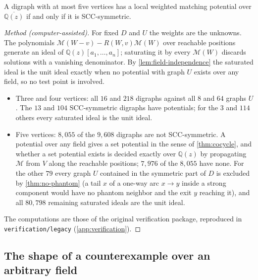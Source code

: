 \documentclass[final]{siamart0516}
\numberwithin{theorem}{section}
\numberwithin{equation}{section}
\theoremstyle{siamnonum}
\theoremstyle{plain}
\newcommand{\code}[1]{{\ttfamily\nolinkurl{#1}}}
\newcommand{\QQ}{\mathbb{Q}}
\newcommand{\Qz}{\QQ(z)}
\newcommand{\Qzbar}{\overline{\QQ(z)}}
\newcommand{\Mpot}{\mathcal{M}}           %
\begin{document}
\begin{theorem}\label{thm:exact5}
A digraph with at most five vertices has a local weighted matching potential over $\Qzbar$ if and only if it is SCC-symmetric.
\end{theorem}
\begin{proof}[Method \textup{(computer-assisted)}]
For fixed $D$ and $U$ the weights are the unknowns. The polynomials $\Mpot(W-v)-R(W,v)\Mpot(W)$ over reachable positions generate an ideal of $\Qz[a_1,\dots,a_n]$; saturating it by every $\Mpot(W)$ discards solutions with a vanishing denominator. By \cref{lem:field-independence} the saturated ideal is the unit ideal exactly when no potential with graph $U$ exists over any field, so no test point is involved.
\begin{itemize}
\item Three and four vertices: all $16$ and $218$ digraphs against all $8$ and $64$ graphs $U$. The $13$ and $104$ SCC-symmetric digraphs have potentials; for the $3$ and $114$ others every saturated ideal is the unit ideal.
\item Five vertices: $8{,}055$ of the $9{,}608$ digraphs are not SCC-symmetric. A potential over any field gives a set potential in the sense of \cref{thm:cocycle}, and whether a set potential exists is decided exactly over $\Qz$ by propagating $\Mpot$ from $V$ along the reachable positions; $7{,}976$ of the $8{,}055$ have none. For the other $79$ every graph $U$ contained in the symmetric part of $D$ is excluded by \cref{thm:no-phantom} (a tail $x$ of a one-way arc $x\to y$ inside a strong component would have no phantom neighbor and the exit $y$ reaching it), and all $80{,}798$ remaining saturated ideals are the unit ideal.
\end{itemize}
The computations are those of the original verification package, reproduced in \code{verification/legacy} (\cref{app:verification}).
\end{proof}

\subsection{The shape of a counterexample over an arbitrary field}
\end{document}
